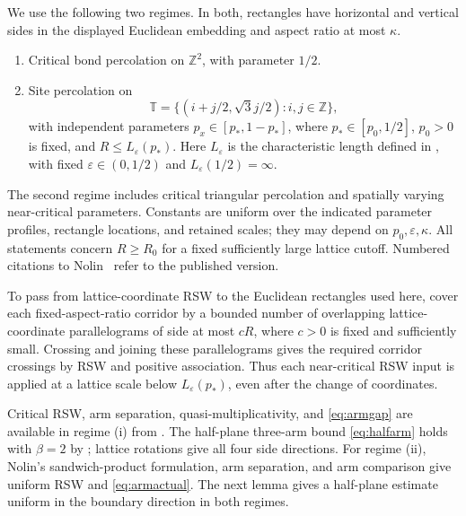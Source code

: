 \documentclass[11pt]{amsart}
\theoremstyle{remark}
\begin{document}
We use the following two regimes. In both, rectangles have horizontal and vertical sides in the displayed Euclidean embedding and aspect ratio at most $\kappa$.
\begin{enumerate}[label=(\roman*)]
\item Critical bond percolation on $\mathbb Z^2$, with parameter $1/2$.
\item Site percolation on
\[
 \mathbb T=\{(i+j/2,\sqrt3j/2):i,j\in\mathbb Z\},
\]
with independent parameters $p_x\in[p_*,1-p_*]$, where $p_*\in[p_0,1/2]$, $p_0>0$ is fixed, and $R\le L_\varepsilon(p_*)$. Here $L_\varepsilon$ is the characteristic length defined in \cite[Section~3.1]{Nolin}, with fixed $\varepsilon\in(0,1/2)$ and $L_\varepsilon(1/2)=\infty$.
\end{enumerate}
The second regime includes critical triangular percolation and spatially varying near-critical parameters. Constants are uniform over the indicated parameter profiles, rectangle locations, and retained scales; they may depend on $p_0,\varepsilon,\kappa$. All statements concern $R\ge R_0$ for a fixed sufficiently large lattice cutoff. Numbered citations to Nolin~\cite{Nolin} refer to the published version.

To pass from lattice-coordinate RSW to the Euclidean rectangles used here, cover each fixed-aspect-ratio corridor by a bounded number of overlapping lattice-coordinate parallelograms of side at most $cR$, where $c>0$ is fixed and sufficiently small. Crossing and joining these parallelograms gives the required corridor crossings by RSW and positive association. Thus each near-critical RSW input is applied at a lattice scale below $L_\varepsilon(p_*)$, even after the change of coordinates.

Critical RSW, arm separation, quasi-multiplicativity, and \eqref{eq:armgap} are available in regime (i) from \cite[Section~2.2]{GPS}. The half-plane three-arm bound \eqref{eq:halfarm} holds with $\beta=2$ by \cite[equation~(4.12)]{GPS}; lattice rotations give all four side directions. For regime (ii), Nolin's sandwich-product formulation, arm separation, and arm comparison \cite[Definition~5, Theorems~11 and~27, Proposition~17]{Nolin} give uniform RSW and \eqref{eq:armactual}. The next lemma gives a half-plane estimate uniform in the boundary direction in both regimes.
\end{document}
